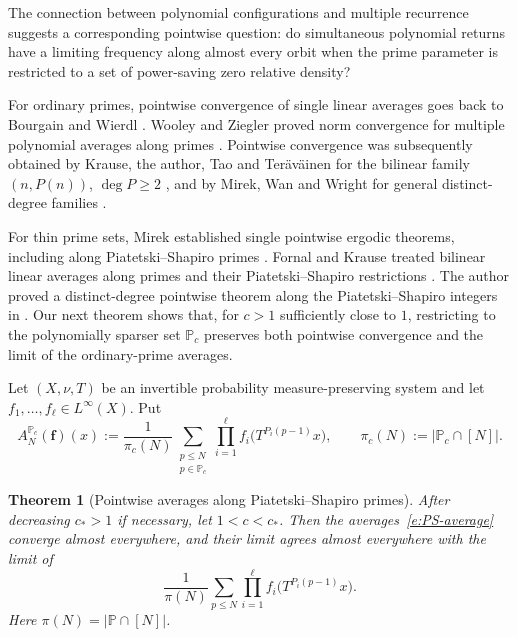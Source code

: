 \documentclass[12pt]{amsart}
\newcommand{\1}{\mathbf 1}
\newtheorem{theorem}{Theorem}[section]
\begin{document}
The connection between polynomial configurations and multiple recurrence
suggests a corresponding pointwise question: do simultaneous polynomial
returns have a limiting frequency along almost every orbit when the
prime parameter is restricted to a set of power-saving zero relative
density?

For ordinary primes, pointwise convergence of single linear averages
goes back to Bourgain and Wierdl \cite{BourgainPrimes,WierdlPrimes}.
Wooley and Ziegler proved norm convergence for multiple polynomial
averages along primes \cite{WooleyZiegler}. Pointwise convergence was
subsequently obtained by Krause, the author, Tao and Ter\"av\"ainen for
the bilinear family $(n,P(n))$, $\deg P\geq2$
\cite{KMTTPointwise}, and by Mirek, Wan and Wright for general
distinct-degree families \cite{MirekWanWright}.

For thin prime sets, Mirek established single pointwise ergodic
theorems, including along Piatetski--Shapiro primes
\cite{MirekThinPrimes}. Fornal and Krause treated bilinear linear
averages along primes and their Piatetski--Shapiro restrictions
\cite{FornalKrause}. The author proved a distinct-degree pointwise
theorem along the Piatetski--Shapiro integers in
\cite[Theorem~1.2]{mousavisolo}. Our next theorem shows that, for
$c>1$ sufficiently close to $1$, restricting to the polynomially
sparser set $\mathbb P_c$ preserves both pointwise convergence
and the limit of the ordinary-prime averages.  

 Let $(X,\nu,T)$ be an invertible
probability measure-preserving system and let
$f_1,\ldots,f_\ell\in L^\infty(X)$.  Put
\begin{equation}\label{e:PS-average}
 A_N^{\mathbb P_c}(\mathbf f)(x)
 :=\frac1{\pi_c(N)}
 \sum_{\substack{p\leq N\\p\in\mathbb P_c}}
 \prod_{i=1}^{\ell}f_i\bigl(T^{P_i(p-1)}x\bigr),
 \qquad \pi_c(N):=|\mathbb P_c\cap[N]|.
\end{equation}



\begin{theorem}[Pointwise averages along Piatetski--Shapiro primes]
\label{t:pointwise}
After decreasing $c_*>1$ if necessary, let $1<c<c_*$.  Then the
averages~\eqref{e:PS-average} converge almost everywhere, and their limit
agrees almost everywhere with the limit of
\begin{equation}\label{e:prime-average}
 \frac1{\pi(N)}\sum_{p\leq N}
 \prod_{i=1}^{\ell}f_i\bigl(T^{P_i(p-1)}x\bigr).
\end{equation}
Here $\pi(N)=|\mathbb P\cap[N]|$.
\end{theorem}
\end{document}
